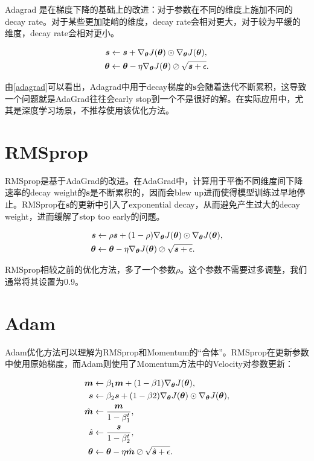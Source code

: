 Adagrad 是在梯度下降的基础上的改进：对于参数在不同的维度上施加不同的decay rate。对于某些更加陡峭的维度，decay rate会相对更大，对于较为平缓的维度，decay rate会相对更小。

\begin{align}
  \label{adagrad}
  \bm{s} &\leftarrow \bm{s} + \nabla_{\bm{\theta}}{J(\bm{\theta})} \odot \nabla_{\bm{\theta}}{J(\bm{\theta})},\\
  \bm{\theta} &\leftarrow \bm{\theta} - \eta\nabla_{\bm{\theta}}{J(\bm{\theta})} \oslash \sqrt{\bm{s} + \epsilon} . \notag
\end{align}

由\ref{adagrad}可以看出，Adagrad中用于decay梯度的$\bm{s}$会随着迭代不断累积，这导致一个问题就是AdaGrad往往会early stop到一个不是很好的解。在实际应用中，尤其是深度学习场景，不推荐使用该优化方法。

\section{RMSprop}

RMSprop是基于AdaGrad的改进。在AdaGrad中，计算用于平衡不同维度间下降速率的decay weight的$\bm{s}$是不断累积的，因而会blew up进而使得模型训练过早地停止。RMSprop在$\bm{s}$的更新中引入了exponential decay，从而避免产生过大的decay weight，进而缓解了stop too early的问题。

\begin{align}
  \label{rmsprop}
  \bm{s} &\leftarrow \rho\bm{s} + (1-\rho) \nabla_{\bm{\theta}}{J(\bm{\theta})} \odot \nabla_{\bm{\theta}}{J(\bm{\theta})},\\
  \bm{\theta} &\leftarrow \bm{\theta} - \eta\nabla_{\bm{\theta}}{J(\bm{\theta})} \oslash \sqrt{\bm{s} + \epsilon} . \notag
\end{align}

RMSprop相较之前的优化方法，多了一个参数$\rho$。这个参数不需要过多调整，我们通常将其设置为0.9。

\section{Adam}

Adam优化方法可以理解为RMSprop和Momentum的“合体”。RMSprop在更新参数中使用原始梯度，而Adam则使用了Momentum方法中的Velocity对参数更新：

\begin{align}
  \label{adam}
  \bm{m} &\leftarrow \beta_1\bm{m} + (1 - \beta1) \nabla_{\bm{\theta}}{J(\bm{\theta})},\\
  \bm{s} &\leftarrow \beta_2\bm{s} + (1 - \beta2) \nabla_{\bm{\theta}}{J(\bm{\theta})} \odot \nabla_{\bm{\theta}}{J(\bm{\theta})}, \notag \\
  \hat{\bm{m}} &\leftarrow \frac{\bm{m}}{1 - \beta_1^t}, \notag\\
  \hat{\bm{s}} &\leftarrow \frac{\bm{s}}{1 - \beta_2^t}, \notag\\
  \bm{\theta} &\leftarrow \bm{\theta} - \eta\hat{\bm{m}} \oslash \sqrt{\hat{\bm{s}} + \epsilon} . \notag
\end{align}


